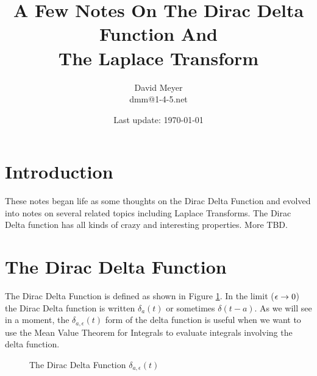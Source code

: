 \documentclass{article}
\title{A Few Notes On The Dirac Delta Function And \\ The Laplace Transform}
\author{David Meyer \\ dmm@1-4-5.net}
\date{Last update: \today}							%
\theoremstyle{definition}
\begin{document}
\maketitle

\section{Introduction}
These notes began life as some thoughts on the Dirac Delta Function and evolved into notes on several related topics including  Laplace Transforms. The 
Dirac Delta function has all kinds of crazy and interesting properties. More TBD.

\section{The Dirac Delta Function}
The Dirac Delta Function is defined as shown in Figure \ref{fig:delta}. In the limit ($\mathlarger{\epsilon} \to 0$) the
 Dirac Delta function is written $\delta_a(t)$ or sometimes $\delta(t - a)$. As we will see in a moment, the $\delta_{a,\epsilon}(t)$ form of the delta function
 is useful when we want to use the Mean Value Theorem for Integrals \cite{wiki:meam_value_theorem_for_integrals} to evaluate integrals involving the delta function.
 
\bigskip

\begin{figure}[H]
  \centering
  \caption{The Dirac Delta Function $\delta_{a,\epsilon}(t)$}
  \label{fig:delta}
\end{figure}
\end{document}
